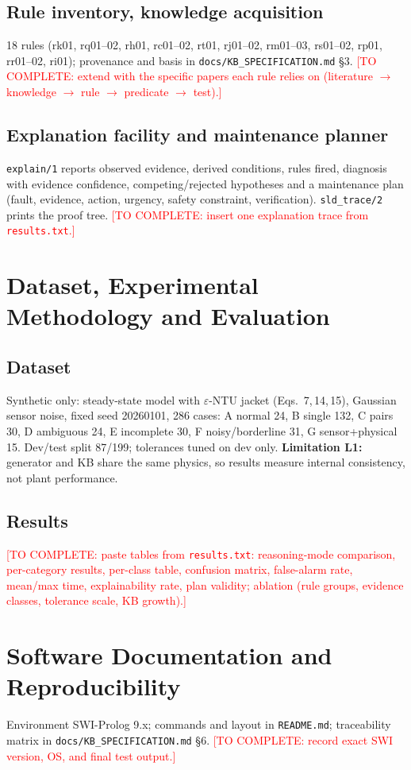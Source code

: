 \documentclass[11pt,a4paper]{article}
\newcommand{\TODO}[1]{\textcolor{red}{[TO COMPLETE: #1]}}
\begin{document}
\subsection{Rule inventory, knowledge acquisition}
18 rules (rk01, rq01--02, rh01, rc01--02, rt01, rj01--02, rm01--03, rs01--02, rp01, rr01--02, ri01); provenance and basis in \texttt{docs/KB\_SPECIFICATION.md} §3. \TODO{extend with the specific papers each rule relies on (literature $\to$ knowledge $\to$ rule $\to$ predicate $\to$ test).}
\subsection{Explanation facility and maintenance planner}
\texttt{explain/1} reports observed evidence, derived conditions, rules fired, diagnosis with evidence confidence, competing/rejected hypotheses and a maintenance plan (fault, evidence, action, urgency, safety constraint, verification). \texttt{sld\_trace/2} prints the proof tree. \TODO{insert one explanation trace from \texttt{results.txt}.}

\section{Dataset, Experimental Methodology and Evaluation}
\subsection{Dataset}
Synthetic only: steady-state model with $\varepsilon$-NTU jacket (Eqs.~7,\,14,\,15), Gaussian sensor noise, fixed seed 20260101, 286 cases: A normal 24, B single 132, C pairs 30, D ambiguous 24, E incomplete 30, F noisy/borderline 31, G sensor+physical 15. Dev/test split 87/199; tolerances tuned on dev only. \textbf{Limitation L1:} generator and KB share the same physics, so results measure internal consistency, not plant performance.
\subsection{Results}
\TODO{paste tables from \texttt{results.txt}: reasoning-mode comparison, per-category results, per-class table, confusion matrix, false-alarm rate, mean/max time, explainability rate, plan validity; ablation (rule groups, evidence classes, tolerance scale, KB growth).}

\section{Software Documentation and Reproducibility}
Environment SWI-Prolog 9.x; commands and layout in \texttt{README.md}; traceability matrix in \texttt{docs/KB\_SPECIFICATION.md} §6. \TODO{record exact SWI version, OS, and final test output.}
\end{document}
